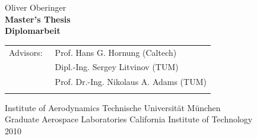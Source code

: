 \begin{center}
Oliver Oberinger\\
\vspace*{1.0cm}
{\bfseries Master's Thesis}\\
{\bfseries Diplomarbeit}
\vspace*{0.5cm}


\vspace*{3cm}




\vspace*{1.2cm}
\normalsize
\vfill
\begin{tabular}{ll}
Advisors: & ~Prof. Hans G. Hornung (Caltech)\\
\ & \ Dipl.-Ing. Sergey Litvinov (TUM)\\
\ & \ Prof. Dr.-Ing. Nikolaus A. Adams (TUM)\\
 \\
\end{tabular}

\vspace*{1.6cm}
Institute of Aerodynamics Technische Universit\"{a}t M\"{u}nchen\\
Graduate Aerospace Laboratories California Institute of Technology\\
2010	
\end{center}

\pagebreak
\pagestyle{plain}

%

